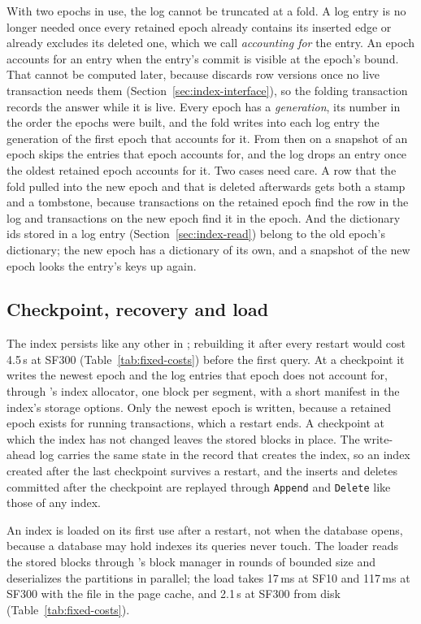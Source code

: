 With two epochs in use, the log cannot be truncated at a fold. A log entry is no longer needed once every retained epoch already
contains its inserted edge or already excludes its deleted one, which we call \emph{accounting for} the entry. An epoch
accounts for an entry when the entry's commit is visible at the epoch's bound. That cannot be computed later, because
\duckdb discards row versions once no live transaction needs them (Section~\ref{sec:index-interface}), so the folding
transaction records the answer while it is live. Every epoch has a \emph{generation}, its number in
the order the epochs were built, and the fold writes into each log entry the generation of the first epoch that
accounts for it.
From then on a snapshot of an epoch skips the entries that epoch accounts for, and the log drops an entry once the
oldest retained epoch accounts for it. Two cases need care. A row that the fold pulled into the new epoch and that is deleted afterwards gets both a
stamp and a tombstone, because transactions on the retained epoch find the row in the log and transactions on the new
epoch find it in the epoch. And the dictionary ids stored in a log entry (Section~\ref{sec:index-read}) belong to the
old epoch's dictionary; the new epoch has a dictionary of its own, and a snapshot of the new epoch looks the entry's
keys up again.

\subsection{Checkpoint, recovery and load}
\label{sec:index-storage}

The index persists like any other in \duckdb; rebuilding it after every restart would cost 4.5\,s at SF300
(Table~\ref{tab:fixed-costs}) before the first query. At a checkpoint it writes the newest epoch and the log entries that epoch
does not account for, through \duckdb's index allocator, one block per segment, with a short manifest in the index's
storage options. Only the newest epoch is written, because a retained epoch exists for running transactions, which a
restart ends. A checkpoint at which the index has not changed leaves the stored blocks in place. The write-ahead log carries the same state in the record that creates the index, so an index created after
the last checkpoint survives a restart, and the inserts and deletes committed after the checkpoint are replayed
through \texttt{Append} and \texttt{Delete} like those of any index.

An index is loaded on its first use after a restart, not when the database opens, because a database may hold
indexes its queries never touch. The loader reads the stored blocks through \duckdb's block manager in rounds of
bounded size and deserializes the partitions in parallel; the load takes 17\,ms at SF10 and 117\,ms at SF300 with the file in the page cache, and 2.1\,s at SF300 from disk (Table~\ref{tab:fixed-costs}).

